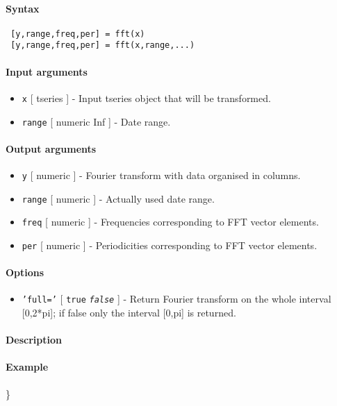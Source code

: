 


	\paragraph{Syntax}
 
 \begin{verbatim}
 [y,range,freq,per] = fft(x)
 [y,range,freq,per] = fft(x,range,...)
 \end{verbatim}
 
 \paragraph{Input arguments}
 
 \begin{itemize}
 \item
   \texttt{x} {[} tseries {]} - Input tseries object that will be
   transformed.
 \item
   \texttt{range} {[} numeric \textbar{} Inf {]} - Date range.
 \end{itemize}
 
 \paragraph{Output arguments}
 
 \begin{itemize}
 \item
   \texttt{y} {[} numeric {]} - Fourier transform with data organised in
   columns.
 \item
   \texttt{range} {[} numeric {]} - Actually used date range.
 \item
   \texttt{freq} {[} numeric {]} - Frequencies corresponding to FFT
   vector elements.
 \item
   \texttt{per} {[} numeric {]} - Periodicities corresponding to FFT
   vector elements.
 \end{itemize}
 
 \paragraph{Options}
 
 \begin{itemize}
 \item
   \texttt{'full='} {[} \texttt{true} \textbar{} \emph{\texttt{false}}
   {]} - Return Fourier transform on the whole interval {[}0,2*pi{]}; if
   false only the interval {[}0,pi{]} is returned.
 \end{itemize}
 
 \paragraph{Description}
 
 \paragraph{Example}
 
 \}


